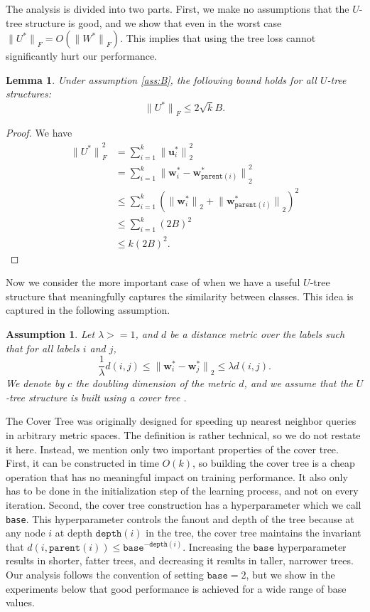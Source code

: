 \documentclass[twoside]{article}
\newtheorem{assumption}{Assumption}
\newtheorem{lemma}{Lemma}
\newcommand{\parent}[1]{\texttt{parent}({#1})}
\renewcommand{\star}[1]{{#1}^{*}}
\newcommand{\uu}{\mathbf u}
\newcommand{\w}{\mathbf w}
\newcommand{\ltwo}[1]{{\lVert {#1} \rVert}_2}
\newcommand{\lF}[1]{{\lVert {#1} \rVert}_F}
\newcommand{\depth}[1]{\texttt{depth}({#1})}
\begin{document}
The analysis is divided into two parts.
First, we make no assumptions that the $U$-tree structure is good,
and we show that even in the worst case $\lF{\star U} = O(\lF{\star W})$.
This implies that using the tree loss cannot significantly hurt our performance.
\begin{lemma}
    \label{lemma:starU}
    Under assumption \ref{ass:B},
    the following bound holds for all $U$-tree structures:
    \begin{equation}
        \lF{\star U} \le 2\sqrt{k}B.
    \end{equation}
\end{lemma}
\begin{proof}
    We have
    \begin{align}
        \lF{\star U}^2 
        &= \sum_{i=1}^k \ltwo{\star\uu_i}^2 \\
        &= \sum_{i=1}^k \ltwo{\star\w_i - \star\w_{\parent{i}}}^2 \\
        &\le \sum_{i=1}^k \left(\ltwo{\star\w_i} + \ltwo{\star\w_{\parent{i}}} \right)^2 \\
        &\le \sum_{i=1}^k (2B)^2 \\
        &\le k (2B)^2
        .
    \end{align}
\end{proof}
Now we consider the more important case of when we have a useful $U$-tree structure that meaningfully captures the similarity between classes.
This idea is captured in the following assumption.
\begin{assumption}
    \label{ass:metric}
    Let $\lambda >= 1$, and $d$ be a distance metric over the labels such that for all labels $i$ and $j$,
\begin{equation}
    \frac 1 \lambda d(i,j)
    \le \ltwo{\star \w_i - \star \w_j}
    \le \lambda d(i, j).
\end{equation}
We denote by $c$ the doubling dimension of the metric $d$,
and we assume that the $U$-tree structure is built using a cover tree \citep{beygelzimer2006cover}.
\end{assumption}

The Cover Tree was originally designed for speeding up nearest neighbor queries in arbitrary metric spaces.
The definition is rather technical, so we do not restate it here.
Instead, we mention only two important properties of the cover tree.
First, it can be constructed in time $O(k)$,
so building the cover tree is a cheap operation that has no meaningful impact on training performance.
It also only has to be done in the initialization step of the learning process, and not on every iteration.
Second, the cover tree construction has a hyperparameter which we call \texttt{base}.
This hyperparameter controls the fanout and depth of the tree because at any node $i$ at depth $\depth{i}$ in the tree,
the cover tree maintains the invariant that $d(i, \parent{i}) \le \texttt{base}^{-\depth{i}}$.
Increasing the $\texttt{base}$ hyperparameter results in shorter, fatter trees,
and decreasing it results in taller, narrower trees.
Our analysis follows the convention of setting $\texttt{base}=2$,
but we show in the experiments below that good performance is achieved for a wide range of base values.
\end{document}
